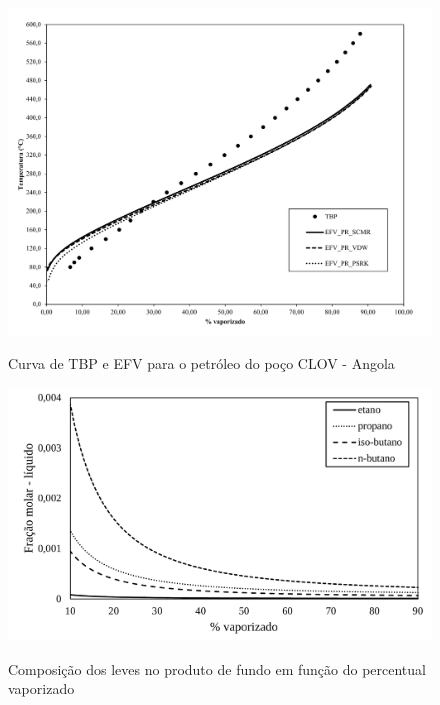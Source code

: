 \begin{figure}[htb]
\centering
{\includegraphics[width=1.0\textwidth]{img/trab3.pdf}} 
\caption{Curva de TBP e EFV para o petróleo do poço CLOV - Angola}
\label{fig:efv}
\end{figure} 

\begin{figure}[htb]
\centering
{\includegraphics[width=1.0\textwidth]{img/trab3liq.pdf}} 
\caption{Composição dos leves no produto de fundo em função do
percentual vaporizado}
\label{fig:liq}
\end{figure}


